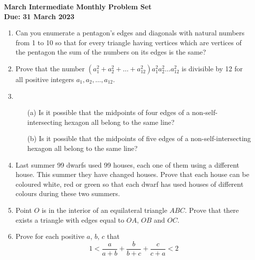 \documentclass{article}
\begin{document}
\thispagestyle{empty}

\begin{center}
  \textbf{\Large March Intermediate Monthly Problem Set}
  \\ \vspace{1em}
  \textbf{\large Due: 31 March 2023}
\end{center}

\bigskip

\begin{enumerate}[itemsep=\fill]

\item %

Can you enumerate a pentagon's edges and diagonals with natural numbers from 1 to 10 so that for every triangle having vertices which are vertices of the pentagon the sum of the numbers on its edges is the same?

\item %

Prove that the number $(a_1^2+a_2^2 + \dots + a_{12}^2)a_1^2a_2^2 \dots a_{12}^2$ is divisible by 12 for all positive integers $a_1,a_2, \dots, a_{12}$.

\item %

\begin{itemize}
\item [(a)] Is it possible that the midpoints of four edges of a non-self-intersecting hexagon all belong to the same line?
\item [(b)] Is it possible that the midpoints of five edges of a non-self-intersecting hexagon all belong to the same line?
\end{itemize}

\item %

Last summer 99 dwarfs used 99 houses, each one of them using a different house. This summer they have changed houses. Prove that each house can be coloured white, red or green so that each dwarf has used houses of different colours during these two summers.

\item %

Point $O$ is in the interior of an equilateral triangle $ABC$. Prove that there exists a triangle with edges equal to $OA$, $OB$ and $OC$.

\item %

Prove for each positive $a$, $b$, $c$ that $$1 < \frac{a}{a+b} + \frac{b}{b+c} + \frac{c}{c+a} < 2$$

\end{enumerate}
\end{document}
